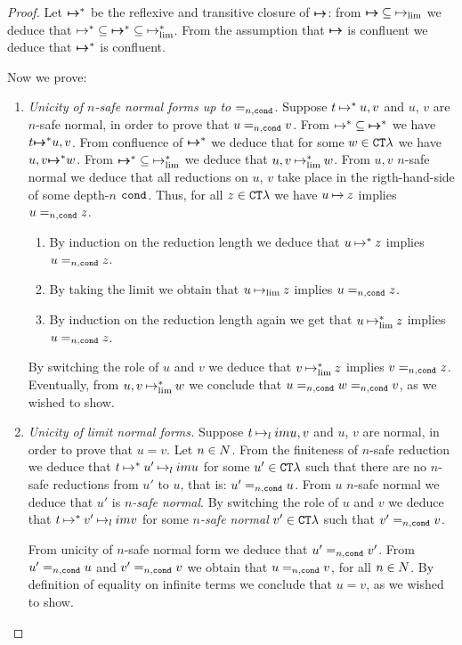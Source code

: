 \begin{proof}
Let ${ \mapsto \mspace{-17mu} \mapsto }^*$ be the reflexive and transitive closure of ${ \mapsto \mspace{-17mu} \mapsto }$:
from ${ \mapsto \mspace{-17mu} \mapsto } \subseteq \mathbin{\mapsto}_{\lim}$ we deduce that
$\mathbin{\mapsto}^* \subseteq { \mapsto \mspace{-17mu} \mapsto }^* \subseteq \mathbin{\mapsto}_{\lim}^*$.
From the assumption that ${ \mapsto \mspace{-17mu} \mapsto }$ is confluent we deduce that
${ \mapsto \mspace{-17mu} \mapsto }^*$ is confluent. 

Now we prove:

\begin{enumerate}

\item
\emph{Unicity of $n$-safe normal forms up to $=_{n,{\tt cond}}$.}
Suppose  $t \mathbin{\mapsto}^* u,v$ and $u$, $v$ are $n$-safe normal, 
in order to prove that $u=_{n,{\tt cond}}  v$.
From $\mathbin{\mapsto}^* \subseteq { \mapsto \mspace{-17mu} \mapsto }^*$ we have 
$t { \mapsto \mspace{-17mu} \mapsto }^* u,v$. From confluence of ${ \mapsto \mspace{-17mu} \mapsto }^*$
we deduce that for some $w \in { {\tt CT}\lambda}$ we have $u,v { \mapsto \mspace{-17mu} \mapsto }^* w$. 
From ${ \mapsto \mspace{-17mu} \mapsto }^* \subseteq \mathbin{\mapsto}_{\lim}^*$
we deduce that $u,v \mathbin{\mapsto}_{\lim}^* w$. From $u,v$ $n$-safe normal we deduce that
all reductions on $u$, $v$ take place in the rigth-hand-side of some depth-$n$ ${\tt cond}$.
Thus, for all $z \in { {\tt CT}\lambda}$ we have
 $u \mathbin{\mapsto} z$ implies $u=_{n,{\tt cond}} z$. 
\begin{enumerate} 
\item
By induction on the reduction
length we deduce that $u \mathbin{\mapsto}^* z$ implies $u=_{n,{\tt cond}} z$. 
\item
By taking the limit
we obtain that $u \mathbin{\mapsto}_{\lim} z$ implies $u=_{n,{\tt cond}} z$. 
\item
By induction on the reduction length again we get  that $u \mathbin{\mapsto}_{\lim}^* z$ implies $u=_{n,{\tt cond}} z$.
\end{enumerate}
By switching the role of $u$ and $v$ we deduce that $v \mathbin{\mapsto}_{\lim}^* z$ implies $v =_{n,{\tt cond}} z$.
Eventually, from $u,v \mathbin{\mapsto}_{\lim}^* w$ we conclude that $u=_{n,{\tt cond}} w =_{n,{\tt cond}} v$,
as we wished to show.

\item
\emph{Unicity of limit normal forms.}
Suppose  $t \mathbin{\mapsto}_lim u,v$ and $u$, $v$ are normal, in order to prove that $u=v$.
Let $n \in {N}$.
From the finiteness of $n$-safe reduction we deduce that $t \mathbin{\mapsto}^* u' \mathbin{\mapsto}_lim u$
for some $u' \in { {\tt CT}\lambda}$ such that there are no $n$-safe reductions from
$u'$ to $u$, that is: $u' =_{n,{\tt cond}} u$. 
From $u$ $n$-safe normal we deduce that $u'$ is \emph{$n$-safe normal}.
By switching the role of $u$ and $v$ we deduce that 
$t \mathbin{\mapsto}^* v' \mathbin{\mapsto}_lim v$ for some \emph{$n$-safe normal} $v' \in { {\tt CT}\lambda}$ 
such that $v'=_{n,{\tt cond}} v$.

From unicity of $n$-safe normal form we deduce that $u'=_{n,{\tt cond}} v'$.
From $u' =_{n,{\tt cond}} u$ and $v' =_{n,{\tt cond}} v$ we obtain that $u =_{n,{\tt cond}} v $, for all $n \in {N}$.
By definition of equality on infinite terms we conclude that $u=v$, as we wished to show.
\end{enumerate}
\end{proof}

